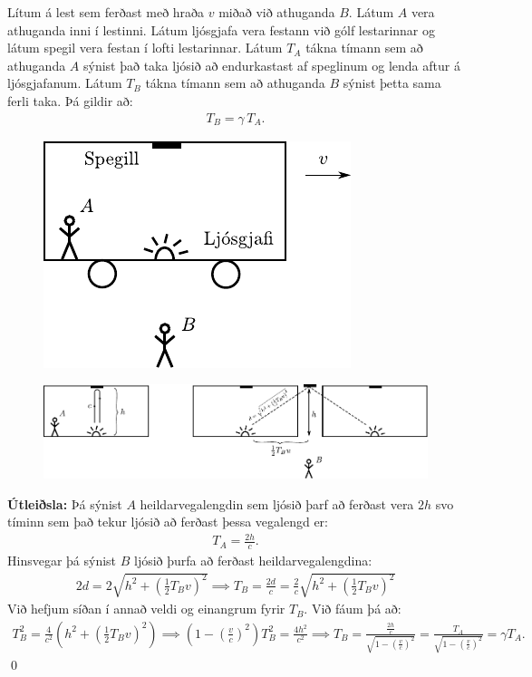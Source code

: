 \begin{tcolorbox}
\begin{theorem}
Lítum á lest sem ferðast með hraða $v$ miðað við athuganda $B$. Látum $A$ vera athuganda inni í lestinni. Látum ljósgjafa vera festann við gólf lestarinnar og látum spegil vera festan í lofti lestarinnar. Látum $T_A$ tákna tímann sem að athuganda $A$ sýnist það taka ljósið að endurkastast af speglinum og lenda aftur á ljósgjafanum. Látum $T_B$ tákna tímann sem að athuganda $B$ sýnist þetta sama ferli taka. Þá gildir að:
\begin{align*}
    T_B = \gamma \, T_A.
\end{align*}
\end{theorem}
\begin{figure}[H]
    \centering
    \includegraphics{figures/trains-einstein1.pdf}
\end{figure}
\end{tcolorbox}

\begin{figure}[H]
    \centering
    \includegraphics{figures/trains-einstein1c.pdf}
\end{figure}

\textbf{Útleiðsla:} Þá sýnist $A$ heildarvegalengdin sem ljósið þarf að ferðast vera $2h$ svo tíminn sem það tekur ljósið að ferðast þessa vegalengd er:
\begin{align*}
    T_A = \frac{2h}{c}.
\end{align*}
Hinsvegar þá sýnist $B$ ljósið þurfa að ferðast heildarvegalengdina:
\begin{align*}
    2d = 2\sqrt{h^2 + \left(\frac{1}{2}T_B v\right)^2} \implies T_B = \frac{2d}{c} = \frac{2}{c}\sqrt{h^2 + \left(\frac{1}{2}T_B v\right)^2}
\end{align*}
Við hefjum síðan í annað veldi og einangrum fyrir $T_B$. Við fáum þá að:
\begin{align*}
    T_B^2 = \frac{4}{c^2}\left(h^2 + \left(\frac{1}{2}T_B v\right)^2 \right) \implies \left(1- \left(\frac{v}{c}\right)^2 \right)T_B^2 = \frac{4h^2}{c^2} \implies T_B = \frac{\frac{2h}{c}}{\sqrt{1- \left( \frac{v}{c} \right)^2}} = \frac{T_A}{\sqrt{1- \left( \frac{v}{c} \right)^2}} = \gamma T_A.
\end{align*}
\qed


